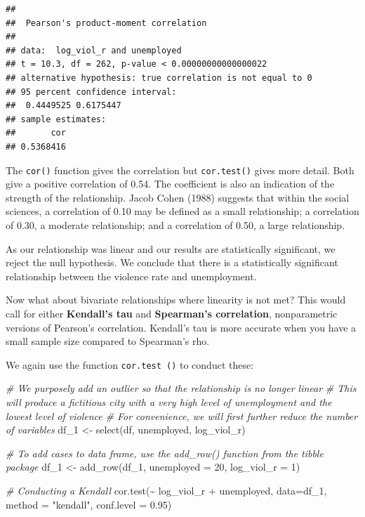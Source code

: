 \documentclass[
]{book}
\newenvironment{Shaded}{\begin{snugshade}}{\end{snugshade}}
\newcommand{\AttributeTok}[1]{\textcolor[rgb]{0.77,0.63,0.00}{#1}}
\newcommand{\CommentTok}[1]{\textcolor[rgb]{0.56,0.35,0.01}{\textit{#1}}}
\newcommand{\DecValTok}[1]{\textcolor[rgb]{0.00,0.00,0.81}{#1}}
\newcommand{\FloatTok}[1]{\textcolor[rgb]{0.00,0.00,0.81}{#1}}
\newcommand{\FunctionTok}[1]{\textcolor[rgb]{0.00,0.00,0.00}{#1}}
\newcommand{\NormalTok}[1]{#1}
\newcommand{\OtherTok}[1]{\textcolor[rgb]{0.56,0.35,0.01}{#1}}
\newcommand{\SpecialCharTok}[1]{\textcolor[rgb]{0.00,0.00,0.00}{#1}}
\newcommand{\StringTok}[1]{\textcolor[rgb]{0.31,0.60,0.02}{#1}}
\begin{document}
\begin{verbatim}
## 
##  Pearson's product-moment correlation
## 
## data:  log_viol_r and unemployed
## t = 10.3, df = 262, p-value < 0.00000000000000022
## alternative hypothesis: true correlation is not equal to 0
## 95 percent confidence interval:
##  0.4449525 0.6175447
## sample estimates:
##       cor 
## 0.5368416
\end{verbatim}

The \texttt{cor()} function gives the correlation but \texttt{cor.test()} gives more detail. Both give a positive correlation of 0.54. The coefficient is also an indication of the strength of the relationship. Jacob Cohen (1988) suggests that within the social sciences, a correlation of 0.10 may be defined as a small relationship; a correlation of 0.30, a moderate relationship; and a correlation of 0.50, a large relationship.

As our relationship was linear and our results are statistically significant, we reject the null hypothesis. We conclude that there is a statistically significant relationship between the violence rate and unemployment.

Now what about bivariate relationships where linearity is not met? This would call for either \textbf{Kendall's tau} and \textbf{Spearman's correlation}, nonparametric versions of Pearson's correlation. Kendall's tau is more accurate when you have a small sample size compared to Spearman's rho.

We again use the function \texttt{cor.test\ ()} to conduct these:

\begin{Shaded}
\begin{Highlighting}[]
\CommentTok{\# We purposely add an outlier so that the relationship is no longer linear}
\CommentTok{\# This will produce a fictitious city with a very high level of unemployment and the lowest level of violence}
\CommentTok{\# For convenience, we will first further reduce the number of variables }
\NormalTok{df\_1 }\OtherTok{\textless{}{-}} \FunctionTok{select}\NormalTok{(df, unemployed, log\_viol\_r) }

\CommentTok{\# To add cases to data frame, use the add\_row() function from the tibble package}
\NormalTok{df\_1 }\OtherTok{\textless{}{-}} \FunctionTok{add\_row}\NormalTok{(df\_1, }\AttributeTok{unemployed =} \DecValTok{20}\NormalTok{, }\AttributeTok{log\_viol\_r =} \DecValTok{1}\NormalTok{)}

\CommentTok{\# Conducting a Kendall}
\FunctionTok{cor.test}\NormalTok{(}\SpecialCharTok{\textasciitilde{}}\NormalTok{ log\_viol\_r }\SpecialCharTok{+}\NormalTok{ unemployed, }\AttributeTok{data=}\NormalTok{df\_1, }\AttributeTok{method =} \StringTok{"kendall"}\NormalTok{, }\AttributeTok{conf.level =} \FloatTok{0.95}\NormalTok{)}
\end{Highlighting}
\end{Shaded}
\end{document}
